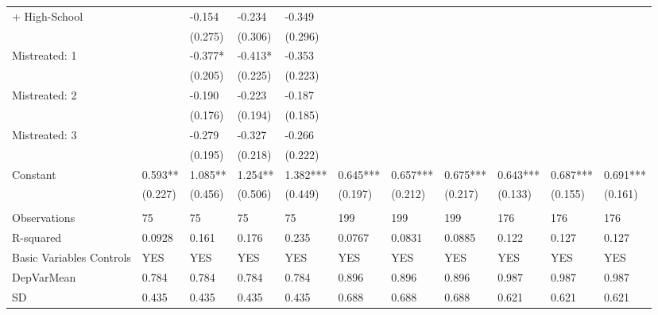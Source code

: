 \begin{tabular}{lllllllllll}
+ High-School &       & -0.154 & -0.234 & -0.349 &       &       &       &       &       &  \\
      &       & (0.275) & (0.306) & (0.296) &       &       &       &       &       &  \\
Mistreated: 1 &       & -0.377* & -0.413* & -0.353 &       &       &       &       &       &  \\
      &       & (0.205) & (0.225) & (0.223) &       &       &       &       &       &  \\
Mistreated: 2 &       & -0.190 & -0.223 & -0.187 &       &       &       &       &       &  \\
      &       & (0.176) & (0.194) & (0.185) &       &       &       &       &       &  \\
Mistreated: 3 &       & -0.279 & -0.327 & -0.266 &       &       &       &       &       &  \\
      &       & (0.195) & (0.218) & (0.222) &       &       &       &       &       &  \\
Constant & 0.593** & 1.085** & 1.254** & 1.382*** & 0.645*** & 0.657*** & 0.675*** & 0.643*** & 0.687*** & 0.691*** \\
      & (0.227) & (0.456) & (0.506) & (0.449) & (0.197) & (0.212) & (0.217) & (0.133) & (0.155) & (0.161) \\
      &       &       &       &       &       &       &       &       &       &  \\
\midrule
Observations & 75    & 75    & 75    & 75    & 199   & 199   & 199   & 176   & 176   & 176 \\
R-squared & 0.0928 & 0.161 & 0.176 & 0.235 & 0.0767 & 0.0831 & 0.0885 & 0.122 & 0.127 & 0.127 \\
Basic Variables Controls & YES   & YES   & YES   & YES   & YES   & YES   & YES   & YES   & YES   & YES \\
DepVarMean & 0.784 & 0.784 & 0.784 & 0.784 & 0.896 & 0.896 & 0.896 & 0.987 & 0.987 & 0.987 \\
SD    & 0.435 & 0.435 & 0.435 & 0.435 & 0.688 & 0.688 & 0.688 & 0.621 & 0.621 & 0.621 \\
\bottomrule
\bottomrule
\end{tabular}%
